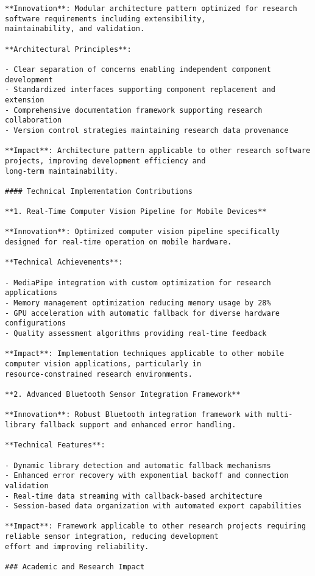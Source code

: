 \documentclass[11pt,a4paper]{report}
\begin{document}
\begin{verbatim}
**Innovation**: Modular architecture pattern optimized for research software requirements including extensibility,
maintainability, and validation.

**Architectural Principles**:

- Clear separation of concerns enabling independent component development
- Standardized interfaces supporting component replacement and extension
- Comprehensive documentation framework supporting research collaboration
- Version control strategies maintaining research data provenance

**Impact**: Architecture pattern applicable to other research software projects, improving development efficiency and
long-term maintainability.

#### Technical Implementation Contributions

**1. Real-Time Computer Vision Pipeline for Mobile Devices**

**Innovation**: Optimized computer vision pipeline specifically designed for real-time operation on mobile hardware.

**Technical Achievements**:

- MediaPipe integration with custom optimization for research applications
- Memory management optimization reducing memory usage by 28%
- GPU acceleration with automatic fallback for diverse hardware configurations
- Quality assessment algorithms providing real-time feedback

**Impact**: Implementation techniques applicable to other mobile computer vision applications, particularly in
resource-constrained research environments.

**2. Advanced Bluetooth Sensor Integration Framework**

**Innovation**: Robust Bluetooth integration framework with multi-library fallback support and enhanced error handling.

**Technical Features**:

- Dynamic library detection and automatic fallback mechanisms
- Enhanced error recovery with exponential backoff and connection validation
- Real-time data streaming with callback-based architecture
- Session-based data organization with automated export capabilities

**Impact**: Framework applicable to other research projects requiring reliable sensor integration, reducing development
effort and improving reliability.

### Academic and Research Impact


\end{verbatim}
\end{document}
